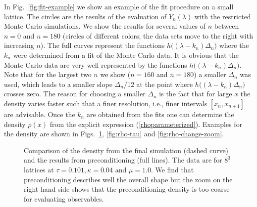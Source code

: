 \documentclass[a4paper,11pt]{article}
\begin{document}
In Fig.~\ref{fig:fit-example} we show an example of the fit procedure on a small lattice. The circles are the results of the
evaluation of $Y_n(\lambda)$ with the restricted Monte Carlo simulations. We show the results for several values of $n$ 
between $n = 0$ and $n = 180$ (circles of different colors; the data sets move to the right with increasing $n$). 
The full curves represent the functions 
$h\Big(\!(\lambda-k_n)\Delta_n \!\Big)$ where the $k_n$ were determined from a fit of the Monte Carlo data. It is
obvious that the Monte Carlo data are very well represented by the functions $h\Big(\!(\lambda-k_n)\Delta_n \!\Big)$. 
Note that for the largest two $n$ we show ($n = 160$ and $n = 180$) a smaller $\Delta_n$ was used, 
which leads to a smaller slope $\Delta_n/12$ at the point where $h\Big(\!(\lambda-k_n)\Delta_n \!\Big)$ crosses zero.
The reason for choosing a smaller $\Delta_n$ is the fact that for large $x$ the density varies faster such that 
a finer resolution, i.e., finer intervals $[x_n, x_{n+1}]$ are advisable. Once the $k_n$ are obtained from the fits
one can determine the density $\rho(x)$ from the explicit expression (\ref{rhoparameterized}). Examples for the density
are shown in Figs.~\ref{fig:preconditioning}, \ref{fig:rho-tau} and \ref{fig:rho-change-zoom}.


\begin{figure}[t]
\centering
\hspace*{-3mm}
\caption{Comparison of the density from the final simulation (dashed curve) and the results from preconditioning 
(full lines). The data are for $8^3$ lattices at $\tau = 0.101, \kappa = 0.04$ and $\mu = 1.0$.
We find that preconditioning describes well the overall shape but the zoom on the right hand side shows
that the preconditioning density is too coarse for evaluating observables.}
\label{fig:preconditioning}
\end{figure}
\end{document}
